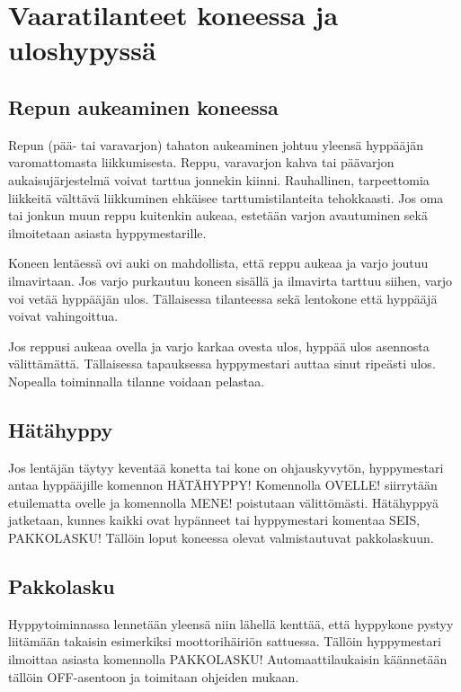 \section{ Vaaratilanteet koneessa ja uloshypyssä }
\label{mahdolliset-vaaratilanteet-vaaratilanteet-koneessa-ja-uloshypyssa}

\subsection{ Repun aukeaminen koneessa }
\label{mahdolliset-vaaratilanteet-repun-aukeaminen-koneessa}


Repun (pää- tai varavarjon) tahaton aukeaminen johtuu yleensä hyppääjän varomattomasta liikkumisesta. Reppu, varavarjon kahva tai päävarjon aukaisujärjestelmä voivat tarttua jonnekin kiinni. Rauhallinen, tarpeettomia liikkeitä välttävä liikkuminen ehkäisee tarttumistilanteita tehokkaasti. Jos oma tai jonkun muun reppu kuitenkin aukeaa, estetään varjon avautuminen sekä ilmoitetaan asiasta hyppymestarille. 


Koneen lentäessä ovi auki on mahdollista, että reppu aukeaa ja varjo joutuu ilmavirtaan. Jos varjo purkautuu koneen sisällä ja ilmavirta tarttuu siihen, varjo voi vetää hyppääjän ulos. Tällaisessa tilanteessa sekä lentokone että hyppääjä voivat vahingoittua.  


Jos reppusi aukeaa ovella ja varjo karkaa ovesta ulos, hyppää ulos asennosta välittämättä. Tällaisessa tapauksessa hyppymestari auttaa sinut ripeästi ulos. Nopealla toiminnalla tilanne voidaan pelastaa. 

\subsection{ Hätähyppy }
\label{mahdolliset-vaaratilanteet-hatahyppy}


Jos lentäjän täytyy keventää konetta tai kone on ohjauskyvytön, hyppymestari antaa hyppääjille komennon HÄTÄHYPPY!  Komennolla OVELLE! siirrytään etuilematta ovelle ja komennolla MENE! poistutaan välittömästi. Hätähyppyä jatketaan, kunnes kaikki ovat hypänneet tai hyppymestari komentaa SEIS, PAKKOLASKU! Tällöin loput koneessa olevat valmistautuvat pakkolaskuun. 

\subsection{ Pakkolasku }
\label{mahdolliset-vaaratilanteet-pakkolasku}


Hyppytoiminnassa lennetään yleensä niin lähellä kenttää, että hyppykone pystyy liitämään takaisin esimerkiksi moottorihäiriön sattuessa. Tällöin hyppymestari ilmoittaa asiasta komennolla PAKKOLASKU! Automaattilaukaisin käännetään tällöin OFF-asentoon ja toimitaan ohjeiden mukaan. 


